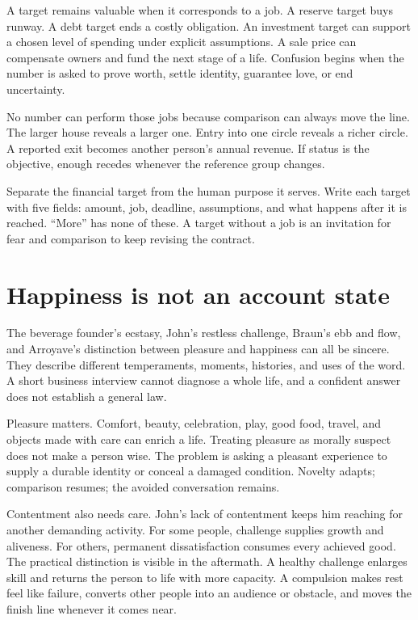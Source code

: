 A target remains valuable when it corresponds to a job. A reserve target buys
runway. A debt target ends a costly obligation. An investment target can
support a chosen level of spending under explicit assumptions. A sale price
can compensate owners and fund the next stage of a life. Confusion begins
when the number is asked to prove worth, settle identity, guarantee love, or
end uncertainty.

No number can perform those jobs because comparison can always move the line.
The larger house reveals a larger one. Entry into one circle reveals a richer
circle. A reported exit becomes another person's annual revenue. If status is
the objective, enough recedes whenever the reference group changes.

Separate the financial target from the human purpose it serves. Write each
target with five fields: amount, job, deadline, assumptions, and what happens
after it is reached. ``More'' has none of these. A target without a job is an
invitation for fear and comparison to keep revising the contract.

\section{Happiness is not an account state}

The beverage founder's ecstasy, John's restless challenge, Braun's ebb and
flow, and Arroyave's distinction between pleasure and happiness can all be
sincere. They describe different temperaments, moments, histories, and uses of
the word. A short business interview cannot diagnose a whole life, and a
confident answer does not establish a general law.

Pleasure matters. Comfort, beauty, celebration, play, good food, travel, and
objects made with care can enrich a life. Treating pleasure as morally suspect
does not make a person wise. The problem is asking a pleasant experience to
supply a durable identity or conceal a damaged condition. Novelty adapts;
comparison resumes; the avoided conversation remains.

Contentment also needs care. John's lack of contentment keeps him reaching for
another demanding activity. For some people, challenge supplies growth and
aliveness. For others, permanent dissatisfaction consumes every achieved
good. The practical distinction is visible in the aftermath. A healthy
challenge enlarges skill and returns the person to life with more capacity. A
compulsion makes rest feel like failure, converts other people into an
audience or obstacle, and moves the finish line whenever it comes near.

